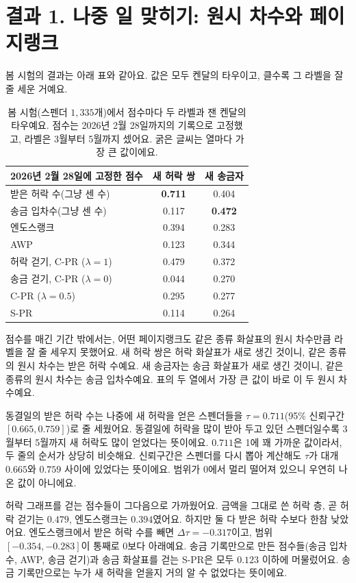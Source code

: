 \section*{결과 1. 나중 일 맞히기: 원시 차수와 페이지랭크}

봄 시험의 결과는 아래 표와 같아요. 값은 모두 켄달의 타우이고, 클수록 그 라벨을 잘 줄 세운 거예요.

\begin{table}[htbp]
\centering
\caption*{봄 시험(스펜더 $1{,}335$개)에서 점수마다 두 라벨과 잰 켄달의 타우예요. 점수는 2026년 2월 28일까지의 기록으로 고정했고, 라벨은 3월부터 5월까지 셌어요. 굵은 글씨는 열마다 가장 큰 값이에요.}
\small
\begin{tabular}{lcc}
\toprule
2026년 2월 28일에 고정한 점수 & 새 허락 쌍 & 새 송금자 \\
\midrule
받은 허락 수(그냥 센 수) & \textbf{0.711} & 0.404 \\
송금 입차수(그냥 센 수) & 0.117 & \textbf{0.472} \\
\midrule
엔도스랭크 & 0.394 & 0.283 \\
AWP & 0.123 & 0.344 \\
허락 걷기, C-PR ($\lambda=1$) & 0.479 & 0.372 \\
송금 걷기, C-PR ($\lambda=0$) & 0.044 & 0.270 \\
C-PR ($\lambda=0.5$) & 0.295 & 0.277 \\
S-PR & 0.114 & 0.264 \\
\bottomrule
\end{tabular}
\end{table}

점수를 매긴 기간 밖에서는, 어떤 페이지랭크도 같은 종류 화살표의 원시 차수만큼 라벨을 잘 줄 세우지 못했어요. 새 허락 쌍은 허락 화살표가 새로 생긴 것이니, 같은 종류의 원시 차수는 받은 허락 수예요. 새 송금자는 송금 화살표가 새로 생긴 것이니, 같은 종류의 원시 차수는 송금 입차수예요. 표의 두 열에서 가장 큰 값이 바로 이 두 원시 차수예요.

동결일의 받은 허락 수는 나중에 새 허락을 얻은 스펜더들을 $\tau=0.711$(95\% 신뢰구간 $[0.665,0.759]$)로 줄 세웠어요. 동결일에 허락을 많이 받아 두고 있던 스펜더일수록 3월부터 5월까지 새 허락도 많이 얻었다는 뜻이에요. $0.711$은 1에 꽤 가까운 값이라서, 두 줄의 순서가 상당히 비슷해요. 신뢰구간은 스펜더를 다시 뽑아 계산해도 $\tau$가 대개 $0.665$와 $0.759$ 사이에 있었다는 뜻이에요. 범위가 0에서 멀리 떨어져 있으니 우연히 나온 값이 아니에요.

허락 그래프를 걷는 점수들이 그다음으로 가까웠어요. 금액을 그대로 쓴 허락 층, 곧 허락 걷기는 $0.479$, 엔도스랭크는 $0.394$였어요. 하지만 둘 다 받은 허락 수보다 한참 낮았어요. 엔도스랭크에서 받은 허락 수를 빼면 $\Delta\tau=-0.317$이고, 범위 $[-0.354,-0.283]$이 통째로 0보다 아래예요. 송금 기록만으로 만든 점수들(송금 입차수, AWP, 송금 걷기)과 송금 화살표를 걷는 S-PR은 모두 $0.123$ 이하에 머물렀어요. 송금 기록만으로는 누가 새 허락을 얻을지 거의 알 수 없었다는 뜻이에요.

